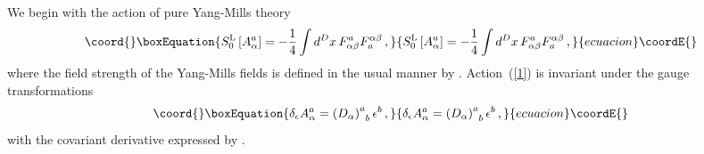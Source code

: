 \documentclass[a4paper,10pt]{article}
\begin{document}
We begin with the action of pure Yang-Mills theory 
\begin{equation}\coord{}\boxEquation{
\label{1}
S_{0}^{\mathrm{L}}\left[ A_{\alpha }^{a}\right] =-\frac{1}{4}\int
d^{D}x\,F_{\alpha \beta }^{a}F_{a}^{\alpha \beta }\,,
}{
S_{0}^{\mathrm{L}}\left[ A_{\alpha }^{a}\right] =-\frac{1}{4}\int
d^{D}x\,F_{\alpha \beta }^{a}F_{a}^{\alpha \beta }\,,
}{ecuacion}\coordE{}\end{equation}
where the field strength of the Yang-Mills fields is defined in the usual
manner by \coordHE{}. 
Action~(\ref{1}) is invariant under the gauge transformations 
\begin{equation}\coord{}\boxEquation{
\label{2}
\delta _{\epsilon }A_{\alpha }^{a}=\left( D_{\alpha }\right)
_{\;\;b}^{a}\epsilon ^{b}\,,
}{
\delta _{\epsilon }A_{\alpha }^{a}=\left( D_{\alpha }\right)
_{\;\;b}^{a}\epsilon ^{b}\,,
}{ecuacion}\coordE{}\end{equation}
with the covariant derivative expressed by \coordHE{}.
\end{document}
